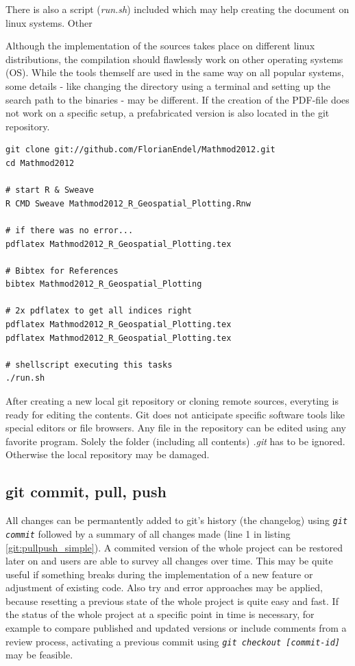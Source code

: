 \documentclass{ifacconf}
\begin{document}
There is also a script (\textit{run.sh}) included which may help creating the document on
linux systems. Other

Although the implementation of the sources takes place on different
linux distributions, the compilation should flawlessly work on other operating systems (OS).
While the tools themself are used in the same way on all popular systems, some details
- like changing the directory using a terminal and setting up the search path to the binaries - may be different.
If the creation of the PDF-file does not work on a specific setup, a prefabricated
version is also located in the git repository. 

\begin{lstlisting}
git clone git://github.com/FlorianEndel/Mathmod2012.git
cd Mathmod2012

# start R & Sweave
R CMD Sweave Mathmod2012_R_Geospatial_Plotting.Rnw

# if there was no error...
pdflatex Mathmod2012_R_Geospatial_Plotting.tex

# Bibtex for References
bibtex Mathmod2012_R_Geospatial_Plotting

# 2x pdflatex to get all indices right
pdflatex Mathmod2012_R_Geospatial_Plotting.tex
pdflatex Mathmod2012_R_Geospatial_Plotting.tex

# shellscript executing this tasks
./run.sh
\end{lstlisting}

After creating a new local git repository or cloning remote sources, everyting is ready for
editing the contents. Git does not anticipate specific software tools like special editors or file browsers. Any file in 
the repository can be edited using any favorite program. Solely the folder (including all contents)
\textit{.git} has to be ignored. Otherwise the local repository may be damaged.

\subsection{git commit, pull, push}
All changes can be permantently 
added to git's history (the changelog) using \textit{\lstinline!git commit!} followed by a 
summary of all changes made (line 1 in listing \ref{git:pullpush_simple}). 
A commited version of the whole project can be restored later on and users are able to
survey all changes over time. This may be
quite useful if something breaks during the implementation of a new feature or adjustment of existing code.
Also try and error approaches may be applied, because resetting a previous state of the whole project is 
quite easy and fast. If the status of the whole project at a specific point in time is necessary, for example
to compare published and updated versions or include comments from a review process, activating  
a previous commit using \textit{\lstinline!git checkout [commit-id]!} may be feasible.
\end{document}
